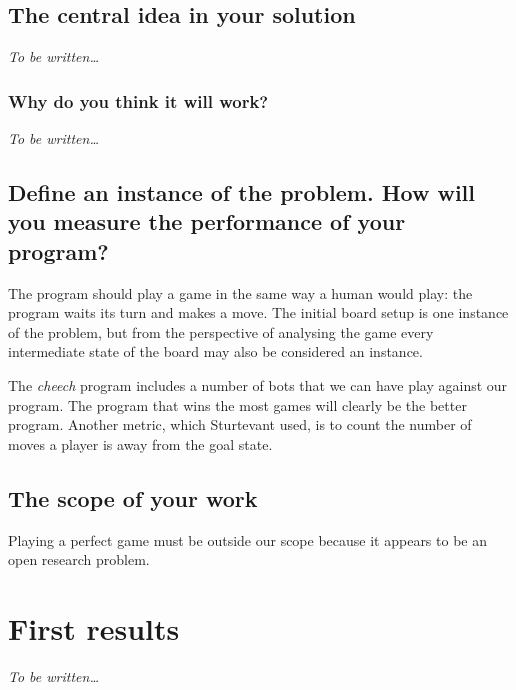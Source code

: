 \documentclass[a4paper,11pt]{report}
\begin{document}
\section{The central idea in your solution}

\emph{To be written\dots}

\subsection{Why do you think it will work?}

\emph{To be written\dots}

\section{Define an instance of the problem. How will you measure the performance of your program?} 

The program should play a game in the same way a human would play: the
program waits its turn and makes a move. The initial board setup is
one instance of the problem, but from the perspective of analysing the
game every intermediate state of the board may also be considered an
instance.

The \emph{cheech} program includes a number of bots that we can have
play against our program. The program that wins the most games will
clearly be the better program. Another metric, which Sturtevant used,
is to count the number of moves a player is away from the goal state.

\section{The scope of your work} 

Playing a perfect game must be outside our scope because it appears to
be an open research problem.

\chapter{First results}

\emph{To be written\dots}








\end{document}
